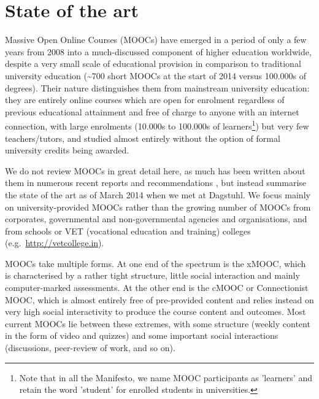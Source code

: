 \section{State of the art}

Massive Open Online Courses (MOOCs) have emerged in a period of only a
few years from 2008 into a much-discussed component of higher education
worldwide, despite a very small scale of educational provision in
comparison to traditional university education (\textasciitilde{}700
short MOOCs at the 
start of 2014 versus 100.000s of degrees).  Their nature distinguishes
them from mainstream university education: they are entirely online
courses which are open for enrolment regardless of previous educational attainment and free of charge to anyone with an
internet connection, with large enrolments (10.000s to 100.000s of
learners\footnote{Note that in all the Manifesto, we name MOOC participants as 'learners' and retain the word 'student' for enrolled students in universities.}) but very few teachers/tutors, and studied almost entirely
without the option of formal university credits being awarded.

We do not review MOOCs in great detail here, as much has been written
about them in numerous recent reports and recommendations 
\cite{gaebel-moocs-2013,uk.gov.mooc-2013,UUK-mooc-2013,
 past-2013,InvasionoftheMOOCs-2014,mroe-2013-report,
 moocs-expectations-and-reality},
but instead summarise the state of
the art as of March 2014 when we met at Dagstuhl.
We focus mainly on university-provided MOOCs rather than
the growing number of MOOCs from corporates, governmental and
non-governmental agencies and organisations, and from schools or VET
(vocational education and training)
colleges (e.g.\ \url{http://vetcollege.in}).

MOOCs take multiple forms.  At one end of the spectrum is the xMOOC,
which is characterised by a rather tight structure, little social
interaction and mainly computer-marked assessments.  
At the other end
is the cMOOC or Connectionist MOOC, which is almost entirely free of
pre-provided content and relies instead on very high social
interactivity to produce the 
course content and outcomes.  Most current MOOCs lie
between these extremes, with some structure (weekly content in the form
of video and quizzes) and some important social interactions
(discussions, peer-review of work, and so on).

